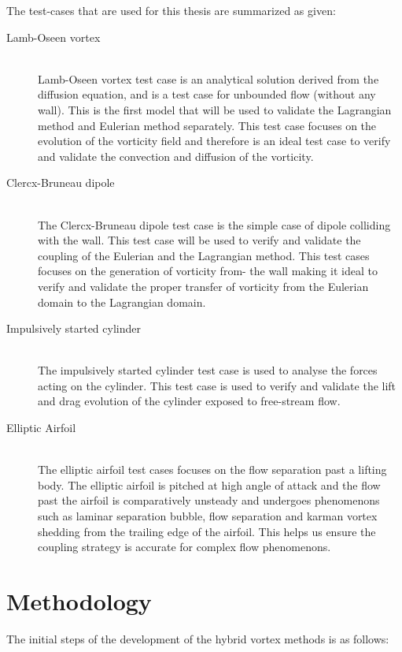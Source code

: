 The test-cases that are used for this thesis are summarized as given:

	\begin{description}
	\item[Lamb-Oseen vortex] \cite{Lamb1993} \cite{Tryggeson2007} \hfill\\
	Lamb-Oseen vortex test case is an analytical solution derived from the diffusion equation, and is a test case for unbounded flow (without any wall). This is the first model that will be used to validate the Lagrangian method and Eulerian method separately. This test case focuses on the evolution of the vorticity field and therefore is an ideal test case to verify and validate the convection and diffusion of the vorticity.
	\item[Clercx-Bruneau dipole] \cite{Clercx2006a}\hfill\\
	The Clercx-Bruneau dipole test case is the simple case of dipole colliding with the wall. This test case will be used to verify and validate the coupling of the Eulerian and the Lagrangian method. This test cases focuses on the generation of vorticity from- the wall making it ideal to verify and validate the proper transfer of vorticity from the Eulerian domain to the Lagrangian domain.
	\item[Impulsively started cylinder] \cite{Koumoutsakos1995a} \cite{Chang1991} \cite{Braza1986} \cite{Lecointe1984}\hfill\\
	The impulsively started cylinder test case is used to analyse the forces acting on the cylinder. This test case is used to verify and validate the lift and drag evolution of the cylinder exposed to free-stream flow.
	\item[Elliptic Airfoil] \cite{Nair1997a}\hfill\\
	The elliptic airfoil test cases focuses on the flow separation past a lifting body. The elliptic airfoil is pitched at high angle of attack and the flow past the airfoil is comparatively unsteady and undergoes phenomenons such as laminar separation bubble, flow separation and karman vortex shedding from the trailing edge of the airfoil. This helps us ensure the coupling strategy is accurate for complex flow phenomenons.
	\end{description}

\section{Methodology}
The initial steps of the development of the hybrid vortex methods is as follows:


